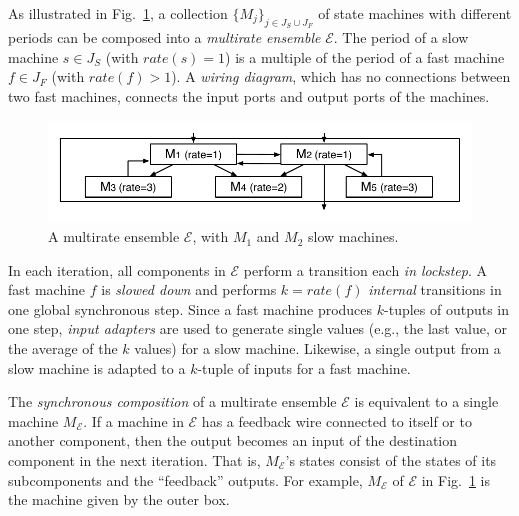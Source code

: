 As illustrated in Fig.~\ref{fig:ensemble},
a collection $\{M_j\}_{j\in J_S\cup J_F}$ of  state machines with different periods 
can be composed into a 
\emph{multirate ensemble} $\mathcal{E}$.
The period of a slow machine $s \in J_S$ (with $\mathit{rate}(s) = 1$) is 
a multiple of the period of a fast machine $f \in J_F$ (with $\mathit{rate}(f) > 1$). 
A \emph{wiring diagram}, which has no connections between two fast
machines,  connects the  input ports and output ports of the machines.

\begin{figure}
\centering
\includegraphics[clip=true,trim=0.3cm 0.4cm 0.3cm 0.4cm,width=\columnwidth]{ensemble.pdf}    
\caption{A multirate ensemble $\mathcal{E}$,
with $M_1$ and $M_2$ slow machines.
}  \label{fig:ensemble}
\end{figure}

In each iteration, all components in $\mathcal{E}$ perform a
transition each \emph{in lockstep}.
A fast machine $f$ is \emph{slowed down} 
and performs $k = \mathit{rate}(f)$ \emph{internal} transitions  in one global synchronous step.
Since 
a fast machine produces $k$-tuples of outputs in one step, 
\emph{input adapters} are used 
to generate single values (e.g., the last value, or 
the average of the $k$ values) for a slow machine. 
Likewise, a single output  from a slow machine is adapted to a $k$-tuple of inputs 
for a fast machine.




The \emph{synchronous composition}  of a multirate ensemble $\mathcal{E}$
is equivalent to a single machine $M_\mathcal{E}$.
If a machine in $\mathcal{E}$ has a feedback wire connected to itself or to another component, then the output becomes an input of the destination component in the next iteration.
That is,  $M_\mathcal{E}$'s states %
consist of the states %
of its subcomponents %
and
the   ``feedback'' outputs. %
For example, 
$M_\mathcal{E}$ of 
$\mathcal{E}$ in Fig.~\ref{fig:ensemble} 
is the machine given by the outer box. 

